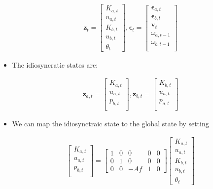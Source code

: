 \documentclass[11pt]{article}
\numberwithin{equation}{section}
\begin{document}
\begin{itemize}
		\begin{align*}
		\mathbf{z}_t =  \left[ {\begin{array}{c}
			K_{a,t} \\
			u_{a,t} \\
			K_{b,t}\\
			u_{b,t} \\
			\theta_t 
			\end{array} } \right], \mathbf{\epsilon}_t =  \left[ {\begin{array}{c}
				\mathbf{\epsilon}_{a,t} \\
				\mathbf{\epsilon}_{b,t} \\
				\mathbf{v}_t \\
				\omega_{a,t-1} \\
				\omega_{b,t-1} \\
				\end{array} } \right]
		\end{align*}
		
		\item The idiosyncratic states are:
		
		\begin{align*}
		\mathbf{z}_{a,t} =  \left[ {\begin{array}{c}
			K_{a,t} \\
			u_{a,t} \\
			p_{b,t} \\
			\end{array} } \right],   \mathbf{z}_{b,t} = \left[ {\begin{array}{c}
			K_{b,t} \\
			u_{a,t} \\
			p_{a,t} \\
			\end{array} } \right] 
		\end{align*}
		
		\item We can map the idiosynctraic state to the global state by setting 
		
		\begin{align*}
		 \left[ {\begin{array}{c}
			K_{a,t} \\
			u_{a,t} \\
			p_{b,t} \\
			\end{array} } \right] = \left[ {\begin{array}{ccccc}
			1 & 0 & 0 & 0 & 0 \\
			0 & 1 & 0 & 0 & 0 \\
			0 & 0 & -Af & 1 & 0
			\end{array} } \right] \left[ {\begin{array}{c}
			K_{a,t} \\
			u_{a,t} \\
			K_{b,t}\\
			u_{b,t} \\
			\theta_t 
			\end{array} } \right]
		\end{align*}
		

\end{itemize}
\end{document}
